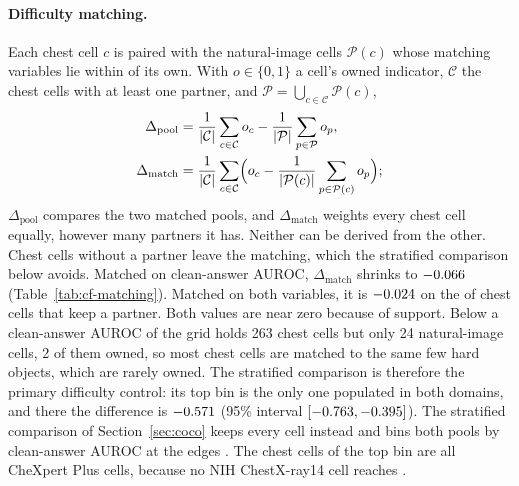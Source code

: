 \documentclass[11pt]{article}
\begin{document}
\paragraph{Difficulty matching.} Each chest cell $c$ is paired with the natural-image cells $\mathcal P(c)$ whose matching variables lie within \cfFgWindow{} of its own. With $o\in\{0,1\}$ a cell's owned indicator, $\mathcal C$ the chest cells with at least one partner, and $\mathcal P=\bigcup_{c\in\mathcal C}\mathcal P(c)$,
\begin{equation}
\begin{aligned}
\Delta_{\text{pool}}&=\frac{1}{|\mathcal C|}\sum_{c\in\mathcal C}o_c-\frac{1}{|\mathcal P|}\sum_{p\in\mathcal P}o_p,\\
\Delta_{\text{match}}&=\frac{1}{|\mathcal C|}\sum_{c\in\mathcal C}\Bigl(o_c-\frac{1}{|\mathcal P(c)|}\sum_{p\in\mathcal P(c)}o_p\Bigr);
\end{aligned}
\label{eq:matching}
\end{equation}
$\Delta_{\text{pool}}$ compares the two matched pools, and $\Delta_{\text{match}}$ weights every chest cell equally, however many partners it has. Neither can be derived from the other. Chest cells without a partner leave the matching, which the stratified comparison below avoids. Matched on clean-answer AUROC, $\Delta_{\text{match}}$ shrinks to $-0.066$ (Table~\ref{tab:cf-matching}). Matched on both variables, it is $-0.024$ on the \cfFgMatchBothN{} of \cfFgMatchBothCells{} chest cells that keep a partner. Both values are near zero because of support. Below a clean-answer AUROC of \cfStratTopEdge{} the grid holds 263 chest cells but only 24 natural-image cells, 2 of them owned, so most chest cells are matched to the same few hard objects, which are rarely owned. The stratified comparison is therefore the primary difficulty control: its top bin is the only one populated in both domains, and there the difference is $-0.571$ (95\% interval $[-0.763,-0.395]$). The stratified comparison of Section~\ref{sec:coco} keeps every cell instead and bins both pools by clean-answer AUROC at the edges \cfStratEdges{}. The \cfStratChestTopN{} chest cells of the top bin are all CheXpert Plus cells, because no NIH ChestX-ray14 cell reaches \cfStratTopEdge{}.
\end{document}
